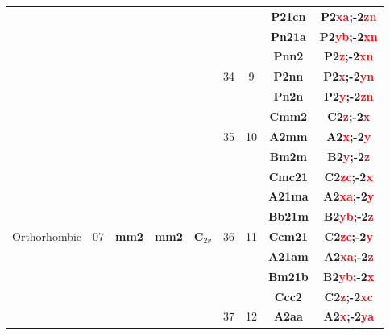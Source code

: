 \documentclass{article}      %
\begin{document}
\begin{small}
\begin{longtable}[c]{|c|c|c|c|c|c|c|c|c|}
          &  & & & &  & &\textbf{P21cn}       &\textbf{P2\textcolor{red}{xa};-2\textcolor{red}{zn}}\\\cline{8-9}         
          &  & & & &  & &\textbf{Pn21a}       &\textbf{P2\textcolor{red}{yb};-2\textcolor{red}{xn}}\\\cline{6-9}         
          &  & & & &  & &\textbf{Pnn2}         &\textbf{P2\textcolor{red}{z};-2\textcolor{red}{xn}}\\\cline{8-9}          
	  &  & & & &\textrm{34}  &\textrm{9} &\textbf{P2nn}         &\textbf{P2\textcolor{red}{x};-2\textcolor{red}{yn}}\\\cline{8-9}          
          &  & & & &  & &\textbf{Pn2n}         &\textbf{P2\textcolor{red}{y};-2\textcolor{red}{zn}}\\\cline{6-9}          
          &  & & & &  & &\textbf{Cmm2}         &\textbf{C2\textcolor{red}{z};-2\textcolor{red}{x}}\\\cline{8-9}           
	  &  & & & &\textrm{35}  &\textrm{10} &\textbf{A2mm}         &\textbf{A2\textcolor{red}{x};-2\textcolor{red}{y}}\\\cline{8-9}           
          &  & & & &  & &\textbf{Bm2m}         &\textbf{B2\textcolor{red}{y};-2\textcolor{red}{z}}\\\cline{6-9}           
          &  & & & &  & &\textbf{Cmc21}       &\textbf{C2\textcolor{red}{zc};-2\textcolor{red}{x}}\\\cline{8-9}          
	  &  & & & &  & &\textbf{A21ma}       &\textbf{A2\textcolor{red}{xa};-2\textcolor{red}{y}}\\\cline{8-9}          
          &  & & & &  & &\textbf{Bb21m}       &\textbf{B2\textcolor{red}{yb};-2\textcolor{red}{z}}\\\cline{8-9}          
\textrm{Orthorhombic}   & \textrm{07} &\textbf{mm2} &\textbf{mm2} &$\mathbf{C}_{2v}$ &36  &\textrm{11} &\textbf{Ccm21}       &\textbf{C2\textcolor{red}{zc};-2\textcolor{red}{y}}\\\cline{8-9}          
          &  & & & &  & &\textbf{A21am}       &\textbf{A2\textcolor{red}{xa};-2\textcolor{red}{z}}\\\cline{8-9}          
          &  & & & &  & &\textbf{Bm21b}       &\textbf{B2\textcolor{red}{yb};-2\textcolor{red}{x}}\\\cline{6-9}          
          &  & & & &  & &\textbf{Ccc2}         &\textbf{C2\textcolor{red}{z};-2\textcolor{red}{xc}}\\\cline{8-9}          
	  &  & & & &\textrm{37}  &\textrm{12} &\textbf{A2aa}         &\textbf{A2\textcolor{red}{x};-2\textcolor{red}{ya}}\\\cline{8-9}          

\end{longtable}
\end{small}
\end{document}
